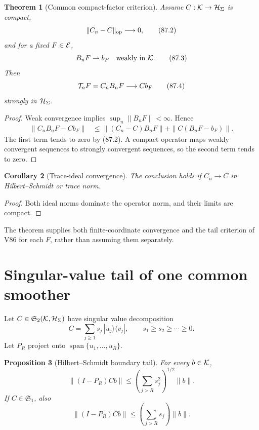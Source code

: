 \documentclass[11pt]{article}
\newtheorem{theorem}{Theorem}[section]
\newtheorem{proposition}[theorem]{Proposition}
\newtheorem{corollary}[theorem]{Corollary}
\theoremstyle{remark}
\begin{document}
\begin{theorem}[Common compact-factor criterion]
\label{thm:v15v87-common}
Assume \(C:{\cal K}\to{\cal H}_\Sigma\) is compact,
\[
 \|C_n-C\|_{\rm op}\longrightarrow0,                  \tag{87.2}
\]
and for a fixed \(F\in{\cal E}\),
\[
 B_nF\rightharpoonup b_F\quad\hbox{weakly in }{\cal K}.          \tag{87.3}
\]
Then
\[
 {\cal T}_nF=C_nB_nF\longrightarrow Cb_F             \tag{87.4}
\]
strongly in \({\cal H}_\Sigma\).
\end{theorem}

\begin{proof}
Weak convergence implies
\(\sup_n\|B_nF\|<\infty\).  Hence
\[
\begin{split}
 \|C_nB_nF-Cb_F\|
 &\leq
 \|(C_n-C)B_nF\|+\|C(B_nF-b_F)\|.
\end{split}
\]
The first term tends to zero by (87.2).  A compact operator maps
weakly convergent sequences to strongly convergent sequences, so
the second term tends to zero.
\end{proof}

\begin{corollary}[Trace-ideal convergence]
\label{cor:v15v87-ideal-convergence}
The conclusion holds if \(C_n\to C\) in Hilbert--Schmidt or trace
norm.
\end{corollary}

\begin{proof}
Both ideal norms dominate the operator norm, and their limits are
compact.
\end{proof}

The theorem supplies both finite-coordinate convergence and the
tail criterion of V86 for each \(F\), rather than assuming them
separately.

\section{Singular-value tail of one common smoother}

Let \(C\in{\mathfrak S}_2({\cal K},{\cal H}_\Sigma)\) have singular
value decomposition
\[
 C=\sum_{j\geq1}s_j\,|u_j\rangle\langle v_j|,
 \qquad s_1\geq s_2\geq\cdots\geq0.                  \tag{87.5}
\]
Let \(P_R\) project onto
\(\operatorname{span}\{u_1,\ldots,u_R\}\).

\begin{proposition}[Hilbert--Schmidt boundary tail]
\label{prop:v15v87-hs-tail}
For every \(b\in{\cal K}\),
\[
 \|(I-P_R)Cb\|
 \leq
 \left(\sum_{j>R}s_j^2\right)^{1/2}\|b\|.             \tag{87.6}
\]
If \(C\in{\mathfrak S}_1\), also
\[
 \|(I-P_R)Cb\|
 \leq
 \left(\sum_{j>R}s_j\right)\|b\|.                     \tag{87.7}
\]
\end{proposition}
\end{document}
